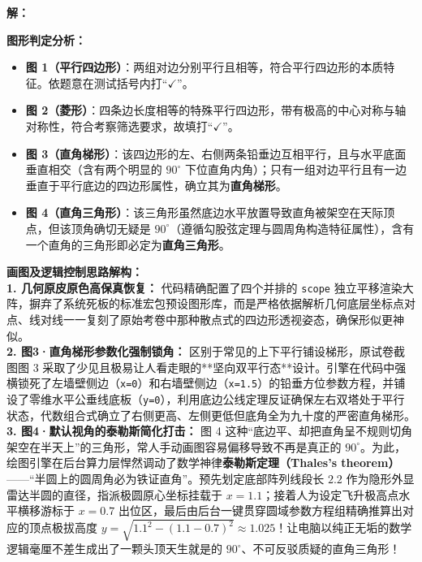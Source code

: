 \vspace{0.4cm}
\textbf{解：}

\textbf{图形判定分析：}
\begin{itemize}
    \item \textbf{图 1（平行四边形）}：两组对边分别平行且相等，符合平行四边形的本质特征。依题意在测试括号内打“$\checkmark$”。
    \item \textbf{图 2（菱形）}：四条边长度相等的特殊平行四边形，带有极高的中心对称与轴对称性，符合考察筛选要求，故填打“$\checkmark$”。
    \item \textbf{图 3（直角梯形）}：该四边形的左、右侧两条铅垂边互相平行，且与水平底面垂直相交（含有两个明显的 $90^\circ$ 下位直角内角）；只有一组对边平行且有一边垂直于平行底边的四边形属性，确立其为\textbf{直角梯形}。
    \item \textbf{图 4（直角三角形）}：该三角形虽然底边水平放置导致直角被架空在天际顶点，但该顶角确切无疑是 $90^\circ$（遵循勾股弦定理与圆周角构造特征属性），含有一个直角的三角形即必定为\textbf{直角三角形}。
\end{itemize}

\vspace{0.4cm}
{\small\color{blue!70!black}
\textbf{画图及逻辑控制思路解构：}\\
\textbf{1. 几何原皮原色高保真恢复：} 代码精确配置了四个并排的 \texttt{scope} 独立平移渲染大阵，摒弃了系统死板的标准宏包预设图形库，而是严格依据解析几何底层坐标点对点、线对线一一复刻了原始考卷中那种散点式的四边形透视姿态，确保形似更神似。\\
\textbf{2. 图3·直角梯形参数化强制锁角：} 区别于常见的上下平行铺设梯形，原试卷截图图 3 采取了少见且极易让人看走眼的**坚向双平行态**设计。引擎在代码中强横锁死了左墙壁侧边（\texttt{x=0}）和右墙壁侧边（\texttt{x=1.5}）的铅垂方位参数方程，并铺设了零维水平公垂线底板（\texttt{y=0}），利用底边公线定理反证确保左右双塔处于平行状态，代数组合式确立了右侧更高、左侧更低但底角全为九十度的严密直角梯形。\\
\textbf{3. 图4·默认视角的泰勒斯简化打击：} 图 4 这种“底边平、却把直角呈不规则切角架空在半天上”的三角形，常人手动画图容易偏移导致不再是真正的 $90^\circ$。为此，绘图引擎在后台算力层悍然调动了数学神律\textbf{泰勒斯定理（Thales's theorem）}——“半圆上的圆周角必为铁证直角”。预先划定底部阵列线段长 $2.2$ 作为隐形外显雷达半圆的直径，指派极圆原心坐标挂载于 $x=1.1$；接着人为设定飞升极高点水平横移游标于 $x=0.7$ 出位区，最后由后台一键贯穿圆域参数方程组精确推算出对应的顶点极拔高度 $y = \sqrt{1.1^2 - (1.1-0.7)^2} \approx 1.025$！让电脑以纯正无垢的数学逻辑毫厘不差生成出了一颗头顶天生就是的 $90^\circ$、不可反驳质疑的直角三角形！
}

